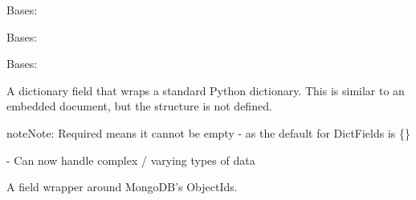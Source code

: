 \documentclass[letterpaper,10pt,english]{sphinxmanual}
\begin{document}
\begin{fulllineitems}
\label{\detokenize{logentry:logentry.LogEntry}}
Bases: 

\begin{fulllineitems}
\label{\detokenize{logentry:logentry.LogEntry.DoesNotExist}}
Bases: 

\end{fulllineitems}


\begin{fulllineitems}
\label{\detokenize{logentry:logentry.LogEntry.MultipleObjectsReturned}}
Bases: 

\end{fulllineitems}


\begin{fulllineitems}
\label{\detokenize{logentry:logentry.LogEntry.data}}
A dictionary field that wraps a standard Python dictionary. This is
similar to an embedded document, but the structure is not defined.

\begin{sphinxadmonition}{note}{Note:}
Required means it cannot be empty - as the default for DictFields is \{\}
\end{sphinxadmonition}


- Can now handle complex / varying types of data

\end{fulllineitems}


\begin{fulllineitems}
\label{\detokenize{logentry:logentry.LogEntry.id}}
A field wrapper around MongoDB's ObjectIds.


\end{fulllineitems}
\end{fulllineitems}
\end{document}

